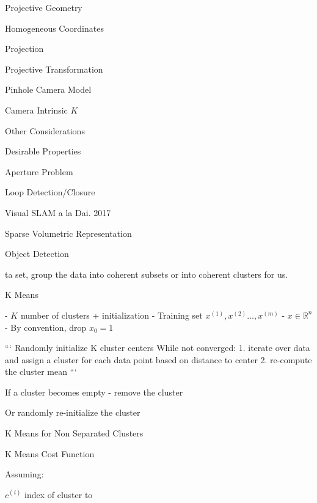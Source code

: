 \begin{section}
\begin{subsubsection}
\begin{subsubsection}
\begin{subsubsection}
\begin{section}{Projective Geometry}
\begin{subsection}{Homogeneous Coordinates}
\begin{subsubsection}
{\begin{subsubsection}{Projection}
\begin{subsubsection}{Projective Transformation}
\begin{subsection}
\begin{subsubsection}
\begin{subsubsection}
\begin{subsubsection}
{\begin{subsubsection}
\begin{subsection}
\begin{subsection} {Pinhole Camera Model}
\begin{subsection} {Camera Intrinsic $K$}
\begin{subsection}
\begin{subsection}
\begin{subsubsection}{Other Considerations}
{\begin{subsection}
\begin{subsubsection}{Desirable Properties}
\begin{section}
\begin{subsection}
\begin{subsection}
\begin{subsection}
\begin{section}
\begin{subsection}
\begin{subsubsection}
\begin{subsubsection}
\begin{subsection}
\begin{section}
\begin{subsection}
\begin{subsubsection}{Aperture Problem}
\begin{subsubsection}
{\begin{section}
\begin{subsubsection}
\begin{subsubsection}
\begin{subsubsection}
\begin{subsection}
\begin{subsection}
\begin{subsection}
\begin{subsection}
\begin{subsection}
\begin{subsection}
\begin{subsection}
\begin{subsubsection}
{\begin{subsubsection}
{\begin{subsubsection}
\begin{section}
\begin{section}
\begin{section}
\begin{subsubsection}
\begin{subsubsection}{Loop Detection/Closure}
\begin{subsubsection}{Visual SLAM a la Dai. 2017}
\begin{subsubsection}{Sparse Volumetric Representation}
\begin{subsection}
\begin{section}{Object Detection}
\begin{subsubsection}
{\begin{subsection}
\begin{subsection}
\begin{section}
\begin{section}
\begin{subsection}
\begin{subsubsection}
\begin{subsubsection}
\begin{subsection}
\begin{subsection}
\begin{subsubsection}
\begin{subsubsection}
\begin{subsubsection}
{\begin{subsection}
\begin{subsection}
\begin{subsection}
\begin{subsection}
\begin{section}
\begin{subsection}
\begin{subsubsection}
\begin{subsubsection}
\begin{subsubsection}
\begin{subsubsection}
\begin{subsubsection}
\begin{subsubsection}
\begin{subsection}
\begin{subsubsection}
\begin{subsection}
\begin{subsection}
\begin{subsubsection}
\begin{subsubsection}
\begin{subsection}
\begin{subsubsection}
{{\begin{section}
\begin{section}
\begin{subsection}
{{{\begin{subsubsection}
\begin{subsubsection}
\begin{subsection}
{\begin{section}
\begin{section}
\begin{section}
\begin{section}
\begin{subsection}
{\begin{section}
ta set, group the data into coherent  subsets or into coherent clusters for us.

\begin{subsection} K Means

- $K$ number of clusters + initialization
- Training set ${x^{(1)},x^{(2)}\dots,x^{(m)}}$
- $x\in\mathbb{R}^n$
- By convention, drop $x_0=1$

```
Randomly initialize K cluster centers
While not converged:
1. iterate over data and assign a cluster for each data point based on distance to center
2. re-compute the cluster mean
```

If a cluster becomes empty - remove the cluster

Or randomly re-initialize the cluster

\begin{subsubsection}{ K Means for Non Separated Clusters

\begin{subsubsection}{ K Means Cost Function

Assuming: 

$c^{(i)}$ index of cluster to }
\end{subsubsection}}
\end{subsubsection}
\end{subsection}
\end{section}}
\end{subsection}
\end{section}
\end{section}
\end{section}
\end{section}}
\end{subsection}
\end{subsubsection}
\end{subsubsection}}}}
\end{subsection}
\end{section}
\end{section}}}
\end{subsubsection}
\end{subsection}
\end{subsubsection}
\end{subsubsection}
\end{subsection}
\end{subsection}
\end{subsubsection}
\end{subsection}
\end{subsubsection}
\end{subsubsection}
\end{subsubsection}
\end{subsubsection}
\end{subsubsection}
\end{subsubsection}
\end{subsection}
\end{section}
\end{subsection}
\end{subsection}
\end{subsection}
\end{subsection}}
\end{subsubsection}
\end{subsubsection}
\end{subsubsection}
\end{subsection}
\end{subsection}
\end{subsubsection}
\end{subsubsection}
\end{subsection}
\end{section}
\end{section}
\end{subsection}
\end{subsection}}
\end{subsubsection}
\end{section}
\end{subsection}
\end{subsubsection}
\end{subsubsection}
\end{subsubsection}
\end{subsubsection}
\end{section}
\end{section}
\end{section}
\end{subsubsection}}
\end{subsubsection}}
\end{subsubsection}
\end{subsection}
\end{subsection}
\end{subsection}
\end{subsection}
\end{subsection}
\end{subsection}
\end{subsection}
\end{subsubsection}
\end{subsubsection}
\end{subsubsection}
\end{section}}
\end{subsubsection}
\end{subsubsection}
\end{subsection}
\end{section}
\end{subsection}
\end{subsubsection}
\end{subsubsection}
\end{subsection}
\end{section}
\end{subsection}
\end{subsection}
\end{subsection}
\end{section}
\end{subsubsection}
\end{subsection}}
\end{subsubsection}
\end{subsection}
\end{subsection}
\end{subsection}
\end{subsection}
\end{subsection}
\end{subsubsection}}
\end{subsubsection}
\end{subsubsection}
\end{subsubsection}
\end{subsection}
\end{subsubsection}
\end{subsubsection}}
\end{subsubsection}
\end{subsection}
\end{section}
\end{subsubsection}
\end{subsubsection}
\end{subsubsection}
\end{section}
